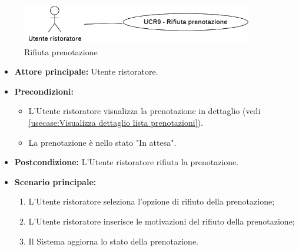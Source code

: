 \label{usecase:Rifiuta prenotazione}

\begin{figure}[h]
	\centering
	\includegraphics[width=0.9\textwidth]{./uml/UCR9.png} 
	\caption{Rifiuta prenotazione}
	\label{fig:UCR9}
  \end{figure}

\begin{itemize}
	\item \textbf{Attore principale:} Utente ristoratore.

	\item \textbf{Precondizioni:}
	      \begin{itemize}
		      \item L'Utente ristoratore visualizza la prenotazione in dettaglio (vedi \autoref{usecase:Visualizza dettaglio lista prenotazioni}).
		      \item La prenotazione è nello stato "In attesa".
	      \end{itemize}

	\item \textbf{Postcondizione:} L'Utente ristoratore rifiuta la prenotazione.



	\item \textbf{Scenario principale:}
	      \begin{enumerate}
		      \item L'Utente ristoratore seleziona l'opzione di rifiuto della prenotazione;

		      \item L'Utente ristoratore inserisce le motivazioni del rifiuto della prenotazione;

		      \item Il Sistema aggiorna lo stato della prenotazione.

	      \end{enumerate}
\end{itemize}
